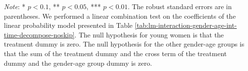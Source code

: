 \documentclass[12pt, a4paper]{article}
\begin{document}
\begin{table}[H]
\begin{threeparttable}
\begin{tablenotes}
\item \emph{Note}: * $p < 0.1$, ** $p < 0.05$, *** $p < 0.01$. The robust standard errors are in parentheses. We performed a linear combination test on the coefficients of the linear probability model presented in Table \ref{tab:lm-interaction-gender-age-int-time-decompose-noskip}. The null hypothesis for young women is that the treatment dummy is zero. The null hypothesis for the other gender-age groups is that the sum of the treatment dummy and the cross term of the treatment dummy and the gender-age group dummy is zero.
\end{tablenotes}
\end{threeparttable}
\end{table}

\begin{table}[H]


\end{table}
\end{document}

